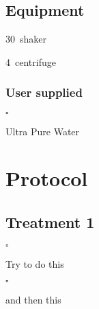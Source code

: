 \documentclass[a4paper,12pt]{article}
\newenvironment{packed_enum}{
\begin{enumerate}
  \setlength{\itemsep}{1pt}
  \setlength{\parskip}{0pt}
  \setlength{\parsep}{0pt}
}{\end{enumerate}}
\newcommand{\checkbox}{$\square$\hspace{1mm}}
\newcommand{\icb}{\item \checkbox}
\begin{document}
	\subsection{Equipment}
			\begin{packed_enum}
				\item 30\textcelsius \ shaker
				\item 4\textcelsius \ centrifuge
			\end{packed_enum}
 
		\subsubsection{User supplied}
			\begin{packed_enum}
				{\icb} Ultra Pure Water
			\end{packed_enum}
\section{Protocol}
	\subsection{Treatment 1}
	\begin{enumerate}
		{\icb} Try to do this
		{\icb} and then this
	\end{enumerate}
\end{document}
